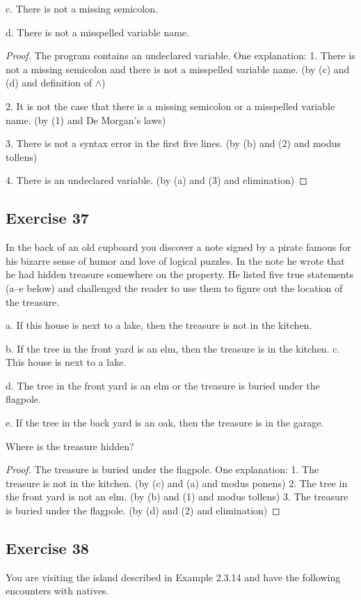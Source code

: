 \documentclass[14pt]{extarticle}
\begin{document}
c. There is not a missing semicolon.

d. There is not a misspelled variable name.

\begin{proof} The program contains an undeclared variable. One explanation:
1. There is not a missing semicolon and there is not a misspelled variable name.
(by (c) and (d) and definition of $\wedge$)

2. It is not the case that there is a missing semicolon or a misspelled variable
name. (by (1) and De Morgan’s laws)

3. There is not a syntax error in the first five lines. (by (b) and (2) and
modus tollens)

4. There is an undeclared variable. (by (a) and (3) and elimination) \end{proof}
\subsection{Exercise 37} In the back of an old cupboard you discover a note
signed by a pirate famous for his bizarre sense of humor and love of logical
puzzles. In the note he wrote that he had hidden treasure somewhere on the
property. He listed five true statements (a–e below) and challenged the reader
to use them to figure out the location of the treasure.

a. If this house is next to a lake, then the treasure is not in the kitchen.

b. If the tree in the front yard is an elm, then the treasure is in the kitchen.
c. This house is next to a lake.

d. The tree in the front yard is an elm or the treasure is buried under the
flagpole.

e. If the tree in the back yard is an oak, then the treasure is in the garage.

Where is the treasure hidden?

\begin{proof} The treasure is buried under the flagpole. One explanation:
1. The treasure is not in the kitchen. (by (c) and (a) and modus ponens)
2. The tree in the front yard is not an elm. (by (b) and (1) and modus tollens)
3. The treasure is buried under the flagpole. (by (d) and (2) and elimination)
\end{proof}

\subsection{Exercise 38} You are visiting the island described in Example 2.3.14
and have the following encounters with natives.
\end{document}
